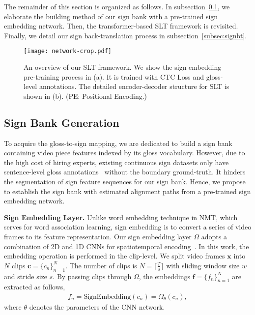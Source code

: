 \documentclass[final]{cvpr}
\begin{document}
The remainder of this section is organized as follows. 
In subsection~\ref{subsec:signbank}, we elaborate the building method of our sign bank with a pre-trained sign embedding network. 
Then, the transformer-based SLT framework is revisited. Finally, we detail our sign back-translation process in subsection~\ref{subsec:signbt}. 

\begin{figure}[tp]
   \centering
   \texttt{[image: network-crop.pdf]}
   \caption{An overview of our SLT framework. We show the sign embedding pre-training process in (a). 
   It is trained with CTC Loss and gloss-level annotations. 
   The detailed encoder-decoder structure for SLT is shown in (b). (PE: Positional Encoding.)
   }\label{fig:framework}
\vspace{-8pt}
\end{figure}

\subsection{Sign Bank Generation} \label{subsec:signbank}

To acquire the gloss-to-sign mapping, we are dedicated to build a sign bank containing video piece features indexed by its gloss vocabulary. 
However, due to the high cost of hiring experts, existing continuous sign datasets only have sentence-level gloss annotations~\cite{slt-nslt-cihan18,phoenix2014,csl-icme16} without the boundary ground-truth. 
It hinders the segmentation of sign feature sequences for our sign bank. 
Hence, we propose to establish the sign bank with estimated alignment paths from a pre-trained sign embedding network. 

\textbf{Sign Embedding Layer.} 
Unlike word embedding technique in NMT, which serves for word association learning, 
sign embedding is to convert a series of video frames to its feature representation. 
Our sign embedding layer $\Omega$ adopts a combination of 2D and 1D CNNs for spatiotemporal encoding~\cite{cui-tmm19}. 
In this work, the embedding operation is performed in the clip-level. 
We split video frames $\mathbf{x}$ into $N$ clips $\mathbf{c}=\{c_n\}_{n=1}^N$. 
The number of clips is $N=\lceil\frac{T}{s}\rceil$ with sliding window size $w$ and stride size $s$. 
By passing clips through $\Omega$, the embeddings $\mathbf{f}=\{f_n\}^N_{n=1}$ are extracted as follows, 
\begin{align} \label{eq:signembedding}
   f_n = \text{SignEmbedding}(c_n)=\Omega_\theta(c_n),
\end{align}
where $\theta$ denotes the parameters of the CNN network. 
\end{document}
